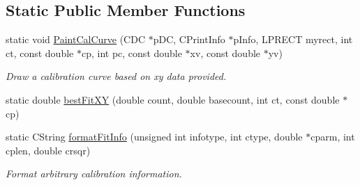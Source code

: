 \subsection*{Static Public Member Functions}
\begin{DoxyCompactItemize}
\item 
static void \hyperlink{classCCalibrationCurve_a6526de50281edf2117c75b9ea84a5a96}{PaintCalCurve} (CDC $\ast$pDC, CPrintInfo $\ast$pInfo, LPRECT myrect, int ct, const double $\ast$cp, int pc, const double $\ast$xv, const double $\ast$yv)
\begin{DoxyCompactList}\small\item\em Draw a calibration curve based on xy data provided. \item\end{DoxyCompactList}\item 
static double \hyperlink{classCCalibrationCurve_a93ec9c1df638b1b991d00a83fe413de1}{bestFitXY} (double count, double basecount, int ct, const double $\ast$cp)
\item 
static CString \hyperlink{classCCalibrationCurve_a17a1f44399dc47e9636ae8b86216319d}{formatFitInfo} (unsigned int infotype, int ctype, double $\ast$cparm, int cplen, double crsqr)
\begin{DoxyCompactList}\small\item\em Format arbitrary calibration information. \item\end{DoxyCompactList}\end{DoxyCompactItemize}
